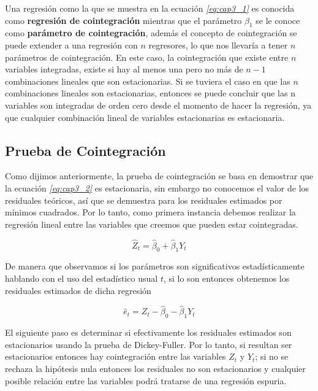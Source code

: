 Una regresión como la que se muestra en la ecuación \textit{\ref{eq:cap3_1}} es conocida como \textbf{regresión de cointegración}  mientras que el parámetro $\beta_1$ se le conoce como \textbf{parámetro de cointegración}, además el concepto de cointegración se puede extender a una regresión con $n$ regresores, lo que nos llevaría a tener $n$ parámetros de cointegración. En este caso, la cointegración que existe entre $n$ variables integradas, existe si hay al menos una pero no más de $n-1$ combinaciones lineales que son estacionarias. Si se tuviera el caso en que las $n$ combinaciones lineales son estacionarias, entonces se puede concluir que las n variables son integradas de orden cero desde el momento de hacer la regresión, ya que cualquier combinación lineal de variables estacionarias es estacionaria.
   
\subsection{Prueba de Cointegración}

Como dijimos anteriormente, la prueba de cointegración se basa en demostrar que la ecuación \textit{\ref{eq:cap3_2}} es estacionaria, sin embargo no conocemos el valor de los residuales teóricos, así que se demuestra para los residuales estimados por mínimos cuadrados. Por lo tanto, como primera instancia debemos realizar la regresión lineal entre las variables que creemos que pueden estar cointegradas.

\begin{equation}
\hat{Z}_t= \hat{\beta}_0 + \hat{\beta}_1Y_t
\end{equation}

De manera que observamos si los parámetros son significativos estadísticamente hablando con el uso del estadístico usual $t$, si lo son entonces obtenemos los residuales estimados de dicha regresión

\begin{equation}
\hat{e}_t= Z_t- \hat{\beta}_0 - \hat{\beta}_1Y_t
\end{equation}

El siguiente paso es determinar si efectivamente los residuales estimados son estacionarios usando la prueba de Dickey-Fuller. Por lo tanto, si resultan ser estacionarios entonces hay cointegración entre las variables $Z_t$ y $Y_t$; si no se rechaza la hipótesis nula entonces los residuales no son estacionarios y cualquier posible relación entre las variables podrá tratarse de  una regresión espuria.\bigskip

